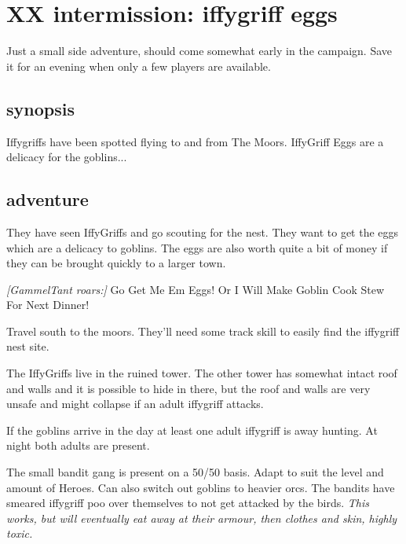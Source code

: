 \clearpage
\section*{XX intermission: iffygriff eggs}
\label{xxiffygriffeggs}

Just a small side adventure, should come somewhat early in the campaign. Save it for an evening when only a few players are available.


\subsection*{synopsis}

Iffygriffs have been spotted flying to and from The Moors. IffyGriff Eggs are a delicacy for the goblins...


\subsection*{adventure}

They have seen IffyGriffs and go scouting for the nest. They want to get the eggs which are a delicacy to goblins. The eggs are also worth quite a bit of money if they can be brought quickly to a larger town.

\begin{readoutloud}
\emph{[GammelTant roars:]}
Go Get Me Em Eggs! Or I Will Make Goblin Cook Stew For Next Dinner!
\end{readoutloud}

\noindent Travel south to the moors. They'll need some track skill to easily find the iffygriff nest site.

The IffyGriffs live in the ruined tower. The other tower has somewhat intact roof and walls and it is possible to hide in there, but the roof and walls are very unsafe and might collapse if an adult iffygriff attacks.

If the goblins arrive in the day at least one adult iffygriff is away hunting. At night both adults are present.

The small bandit gang is present on a 50/50 basis. Adapt to suit the level and amount of Heroes. Can also switch out goblins to heavier orcs. The bandits have smeared iffygriff poo over themselves to not get attacked by the birds. \emph{This works, but will eventually eat away at their armour, then clothes and skin, highly toxic.}


